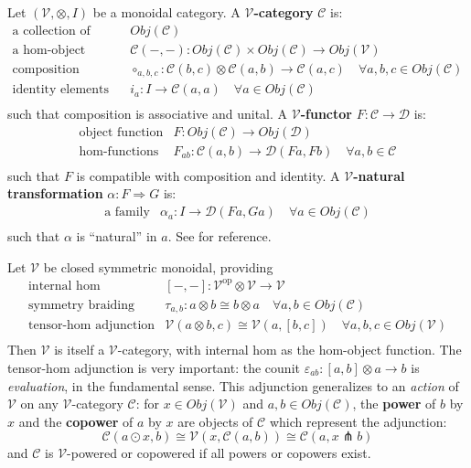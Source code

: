 \documentclass[a4paper,UKenglish]{article}
\newcommand{\op}{\mathrm{op}}
\newcommand{\V}{\mathscr{V}}
\newcommand{\C}{\mathscr{C}}
\newcommand{\D}{\mathscr{D}}
\newcommand{\pfk}{\pitchfork}
\begin{document}
Let $(\V,\otimes,I)$ be a monoidal category. \cite{maclane} A \textbf{$\V$-category} $\C$ is:
\[\begin{array}{rl}
\text{a collection of objects} & Obj(\C)\\
\text{a hom-object function} & \C(-,-):Obj(\C) \times Obj(\C) \to Obj(\V)\\
\text{composition morphisms} & \circ_{a,b,c}:\C(b,c) \otimes \C(a,b) \to \C(a,c) \quad \forall a,b,c \in Obj(\C)\\
\text{identity elements} & i_a:I\to\C(a,a) \quad \forall a \in Obj(\C)\\
\end{array}\]
such that composition is associative and unital. A \textbf{$\V$-functor} $F:\C \to \D$ is:
\[\begin{array}{rl}
\text{object function} & F: Obj(\C) \to Obj(\D)\\
\text{hom-functions} & F_{ab}: \C(a,b) \to \D(Fa,Fb) \quad \forall a,b \in \C\\
\end{array}\]
such that $F$ is compatible with composition and identity. A \textbf{$\V$-natural transformation} $\alpha: F \Rightarrow G$ is:
\[\begin{array}{rl}
\text{a family} & \alpha_a: I \to \D(Fa,Ga) \quad \forall a \in Obj(\C)\\
\end{array}\]
such that $\alpha$ is ``natural'' in $a$. See \cite{enrich} for reference.

Let $\V$ be closed symmetric monoidal, providing
\[\begin{array}{rl}
\text{internal hom} & [-,-]:\V^\op\otimes \V \to \V\\
\text{symmetry braiding} & \tau_{a,b}:a\otimes b\cong b\otimes a \quad \forall a,b \in Obj(\C)\\
\text{tensor-hom adjunction} & \V(a\otimes b,c) \cong \V(a,[b,c]) \quad \forall a,b,c \in Obj(\V)\\
\end{array}\]
Then $\V$ is itself a $\V$-category, with internal hom as the hom-object function. The tensor-hom adjunction is very important: the counit $\varepsilon_{ab}: [a,b]\otimes a \to b$ is \textit{evaluation}, in the fundamental sense. This adjunction generalizes to an \textit{action} of $\V$ on any $\V$-category $\C$: for $x \in Obj(\V)$ and $a,b \in Obj(\C)$, the \textbf{power} of $b$ by $x$ and the \textbf{copower} of $a$ by $x$ are objects of $\C$ which represent the adjunction:
$$\C(a\odot x,b) \cong \V(x, \C(a,b)) \cong \C(a,x\pfk b)$$
and $\C$ is $\V$-powered or copowered if all powers or copowers exist.
\end{document}
